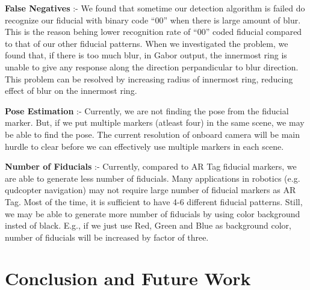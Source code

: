 \documentclass[runningheads]{llncs}
\begin{document}
\textbf{False Negatives} :- We found that sometime our detection algorithm is
failed do recognize our fiducial with binary code ``00'' when there is large
amount of blur. This is the reason behing lower recognition rate of ``00''
coded fiducial compared to that of our other fiducial patterns. When we
investigated the problem, we found that, if there is too much blur, in Gabor
output, the innermost ring is unable to give any response along the direction
perpandicular to blur direction. This problem can be resolved by increasing
radius of innermost ring, reducing effect of blur on the innermost ring.

\textbf{Pose Estimation} :- Currently, we are not finding the pose from the
fiducial marker. But, if we put multiple markers (atleast four) in the same
scene, we may be able to find the pose. The current resolution of onboard camera
will be main hurdle to clear before we can effectively use multiple markers in
each scene.

\textbf{Number of Fiducials} :- Currently, compared to AR Tag fiducial markers,
we are able to generate less number of fiducials. Many applications in
robotics (e.g. qudcopter navigation) may not require large number of fiducial
markers as AR Tag. Most of the time, it is sufficient to have 4-6
different fiducial patterns. Still, we may be able to generate more number of
fiducials by using color background insted of black. E.g., if we just use Red,
Green and Blue as background color, number of fiducials will be increased by
factor of three.

\section{Conclusion and Future Work}




\end{document}
